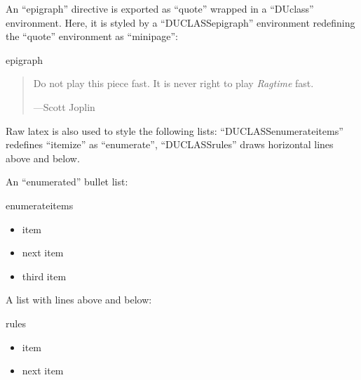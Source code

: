 \documentclass[a4paper]{article}
\begin{document}
An “epigraph” directive is exported as “quote” wrapped in a “DUclass”
environment. Here, it is styled by a “DUCLASSepigraph” environment
redefining the “quote” environment as “minipage”:

\newcommand*{\DUCLASSepigraph}{%
  \renewenvironment{quote}{\vspace{1em}
                           \footnotesize\hfill{}%
                           \begin{minipage}{0.4\columnwidth}}%
                          {\end{minipage}\vskip\baselineskip}}

\begin{DUclass}{epigraph}
\begin{quote}
Do not play this piece fast. It is never right to play \emph{Ragtime} fast.
\nopagebreak

\raggedleft —Scott Joplin
\end{quote}
\end{DUclass}

Raw latex is also used to style the following lists: “DUCLASSenumerateitems”
redefines “itemize” as “enumerate”, “DUCLASSrules” draws horizontal lines
above and below.

\newcommand*{\DUCLASSenumerateitems}{%
  \renewenvironment{itemize}{\begin{enumerate}}%
                            {\end{enumerate}}%
}

\newenvironment{DUCLASSrules}%
               {\noindent\rule[0.5ex]{1\columnwidth}{1pt}}%
               {\noindent\rule[0.5ex]{1\columnwidth}{1pt}}

An “enumerated” bullet list:

\begin{DUclass}{enumerateitems}
\begin{itemize}
\item item

\item next item

\item third item
\end{itemize}
\end{DUclass}

A list with lines above and below:

\begin{DUclass}{rules}
\begin{itemize}
\item item

\item next item
\end{itemize}
\end{DUclass}
\end{document}
